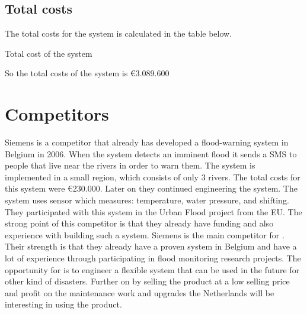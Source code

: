 \subsection{Total costs}
The total costs for the system is calculated in the table below.\\
\newline
\begin{table}[H]
	\caption{Total cost of the system}
	\label{table:totalcosts}
\end{table}
So the total costs of the system is \euro{}3.089.600\\

\section{Competitors}
Siemens is a competitor that already has developed a flood-warning system in Belgium in 2006. When the system detects an imminent flood it sends a SMS to people that live near the rivers in order to warn them. The system is implemented in a small region, which consists of only 3 rivers. The total costs for this system were \euro{}230.000. Later on they continued engineering the system. The system uses sensor which measures: temperature, water pressure, and shifting. They participated with this system in the Urban Flood project from the EU. The strong point of this competitor is that they already have funding and also experience with building such a system. Siemens is the main competitor for \CompanyName{}. Their strength is that they already have a proven system in Belgium and have a lot of experience through participating in flood monitoring research projects. The opportunity for \CompanyName{} is to engineer a flexible system that can be used in the future for other kind of disasters. Further on by selling the product at a low selling price and profit on the maintenance work and upgrades the Netherlands will be interesting in using the product.

